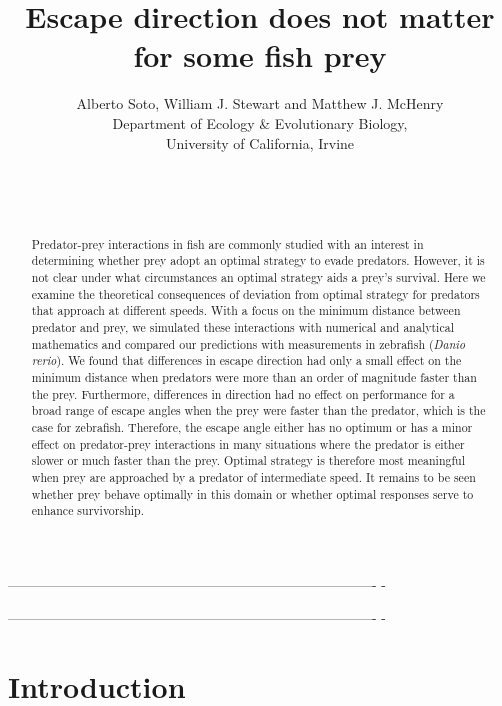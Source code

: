 \documentclass[12pt]{article}
\title{Escape direction does not matter for some fish prey}
\author{Alberto Soto, William J. Stewart and Matthew J. McHenry\\
  Department of Ecology \& Evolutionary Biology,\\
  University of California, Irvine\\ \\ \\ \\}
\begin{document}

\maketitle

\pagebreak


%
-------------------------------------------------------------------------------
-
\begin{abstract}

Predator-prey interactions in fish are commonly studied with an interest in
determining whether prey adopt an optimal strategy to evade predators. However,
it is not clear under what circumstances an optimal strategy aids a prey's
survival. Here we examine the theoretical consequences of deviation from
optimal strategy for predators that approach at different speeds. With a focus
on the minimum distance between predator and prey, we simulated these
interactions with numerical and analytical mathematics and compared our
predictions with measurements in zebrafish (\textit{Danio rerio}). We found
that differences in escape direction had only a small effect on the minimum
distance when predators were more than an order of magnitude faster than the
prey. Furthermore, differences in direction had no effect on performance for a
broad range of escape angles when the prey were faster than the predator, which
is the case for zebrafish. Therefore, the escape angle either has no optimum or
has a minor effect on predator-prey interactions in many situations where the
predator is either slower or much faster than the prey. Optimal strategy is
therefore most meaningful when prey are approached by a predator of
intermediate speed. It remains to be seen whether prey behave optimally in this
domain or whether optimal responses serve to enhance
survivorship.

\end{abstract}

\pagebreak


%
-------------------------------------------------------------------------------
-
\section{Introduction}
\label{intro}
\end{document}
